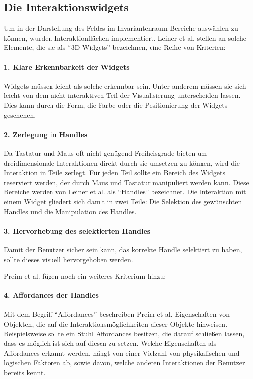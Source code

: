 \documentclass[a4paper,fontsize=12pt,toc=bib,halfparskip]{scrartcl}
\begin{document}
\subsection{Die Interaktionswidgets}
\label{sec:Widget}
Um in der Darstellung des Feldes im Invariantenraum Bereiche ausw\"ahlen zu k\"onnen, wurden Interaktionfl\"achen implementiert. Leiner et al. \cite{leiner1997entwicklung} stellen an solche Elemente, die sie als ``3D Widgets'' bezeichnen, eine Reihe von Kriterien:

\paragraph{1. Klare Erkennbarkeit der Widgets}
Widgets m\"ussen leicht als solche erkennbar sein. Unter anderem m\"ussen sie sich leicht von dem nicht-interaktiven Teil der Visualisierung unterscheiden lassen. Dies kann durch die Form, die Farbe oder die Positionierung der Widgets geschehen.

\paragraph{2. Zerlegung in Handles}
Da Tastatur und Maus oft nicht gen\"ugend Freiheisgrade bieten um dreidimensionale Interaktionen direkt durch sie umsetzen zu k\"onnen, wird die Interaktion in Teile zerlegt. F\"ur jeden Teil sollte ein Bereich des Widgets reserviert werden, der durch Maus und Tastatur manipuliert werden kann. Diese Bereiche werden von Leiner et al. als ``Handles'' bezeichnet. Die Interaktion mit einem Widget gliedert sich damit in zwei Teile: Die Selektion des gew\"unschten Handles und die Manipulation des Handles.

\paragraph{3. Hervorhebung des selektierten Handles}
Damit der Benutzer sicher sein kann, das korrekte Handle selektiert zu haben, sollte dieses visuell hervorgehoben werden.

Preim et al. \cite[S.~340]{preim2015interaktive} f\"ugen noch ein weiteres Kriterium hinzu:

\paragraph{4. Affordances der Handles}
Mit dem Begriff ``Affordances'' beschreiben Preim et al. \cite[S.~137]{preim2010interaktive} Eigenschaften von Objekten, die auf die Interaktionsm\"oglichkeiten dieser Objekte hinweisen. Beispielsweise sollte ein Stuhl Affordances besitzen, die darauf schlie{\ss}en lassen, dass es m\"oglich ist sich auf diesen zu setzen. Welche Eigenschaften als Affordances erkannt werden, h\"angt von einer Vielzahl von physikalischen und logischen Faktoren ab, sowie davon, welche anderen Interaktionen der Benutzer bereits kennt.
\end{document}
